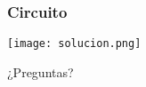 \documentclass[spanish]{beamer}
\begin{document}
\begin{frame}
  \frametitle{Circuito}

  \begin{center}
    \texttt{[image: solucion.png]}
  \end{center}
\end{frame}

\begin{frame}
  \begin{center}
    \Huge{¿Preguntas?}
  \end{center}
\end{frame}
\end{document}
